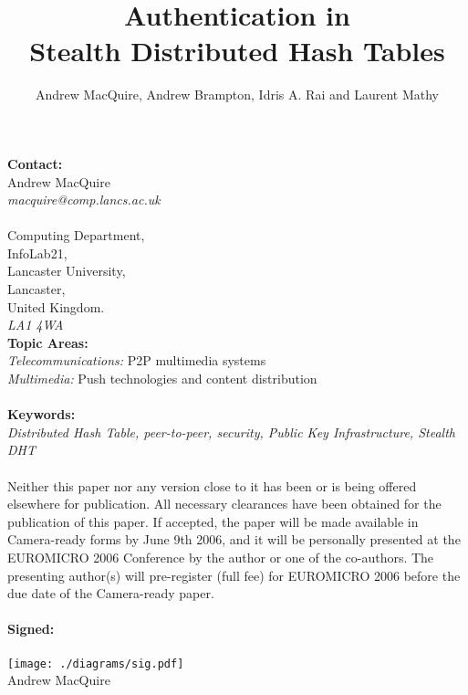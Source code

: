 \documentclass[pdftex,peerreview,11pt]{IEEEtran}
\title{Authentication in\\Stealth Distributed Hash Tables}
\author{Andrew MacQuire, Andrew Brampton, Idris A. Rai and Laurent Mathy}
\begin{document}
\maketitle
\thispagestyle{empty}

\noindent
\textbf{Contact:}\\
Andrew MacQuire\\
\emph{macquire@comp.lancs.ac.uk}\\
\\
Computing Department,\\
InfoLab21,\\
Lancaster University,\\
Lancaster,\\
United Kingdom.\\
\emph{LA1 4WA}\\

\noindent
\textbf{Topic Areas:}\\
\emph{Telecommunications:} P2P multimedia systems\\
\emph{Multimedia:} Push technologies and content distribution
\\
\\
\noindent
\textbf{Keywords:}\\
\emph{Distributed Hash Table, peer-to-peer, security, Public Key
Infrastructure, Stealth DHT}
\\
\\
Neither this paper nor any version close to it has been or is being
offered elsewhere for publication. All necessary clearances have been
obtained for the publication of this paper. If accepted, the paper will
be made available in Camera-ready forms by June 9th 2006, and it will
be personally presented at the EUROMICRO 2006 Conference by the author
or one of the co-authors. The presenting author(s) will pre-register
(full fee) for EUROMICRO 2006 before the due date of the Camera-ready
paper.
\\
\\
\textbf{Signed:}\\
\\
\noindent
\texttt{[image: ./diagrams/sig.pdf]}\\
{\sc Andrew MacQuire}
\end{document}
